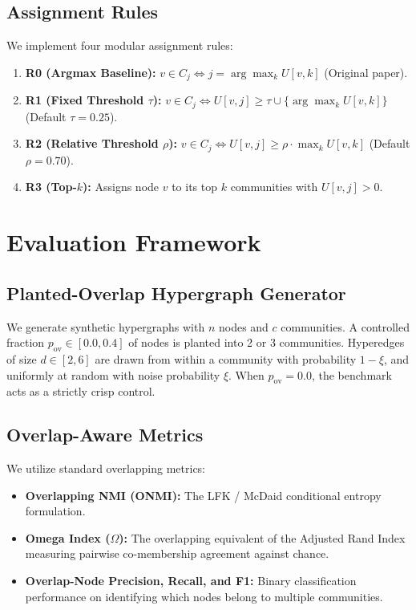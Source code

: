 \documentclass[11pt,a4paper]{article}
\begin{document}
\subsection{Assignment Rules}
We implement four modular assignment rules:
\begin{enumerate}
    \item \textbf{R0 (Argmax Baseline):} $v \in C_j \iff j = \arg\max_k U[v, k]$ (Original paper).
    \item \textbf{R1 (Fixed Threshold $\tau$):} $v \in C_j \iff U[v, j] \ge \tau \cup \{\arg\max_k U[v, k]\}$ (Default $\tau = 0.25$).
    \item \textbf{R2 (Relative Threshold $\rho$):} $v \in C_j \iff U[v, j] \ge \rho \cdot \max_k U[v, k]$ (Default $\rho = 0.70$).
    \item \textbf{R3 (Top-$k$):} Assigns node $v$ to its top $k$ communities with $U[v, j] > 0$.
\end{enumerate}

\section{Evaluation Framework}
\subsection{Planted-Overlap Hypergraph Generator}
We generate synthetic hypergraphs with $n$ nodes and $c$ communities. A controlled fraction $p_{\text{ov}} \in [0.0, 0.4]$ of nodes is planted into 2 or 3 communities. Hyperedges of size $d \in [2, 6]$ are drawn from within a community with probability $1 - \xi$, and uniformly at random with noise probability $\xi$. When $p_{\text{ov}} = 0.0$, the benchmark acts as a strictly crisp control.

\subsection{Overlap-Aware Metrics}
We utilize standard overlapping metrics:
\begin{itemize}
    \item \textbf{Overlapping NMI (ONMI):} The LFK / McDaid conditional entropy formulation.
    \item \textbf{Omega Index ($\Omega$):} The overlapping equivalent of the Adjusted Rand Index measuring pairwise co-membership agreement against chance.
    \item \textbf{Overlap-Node Precision, Recall, and F1:} Binary classification performance on identifying which nodes belong to multiple communities.
\end{itemize}
\end{document}
